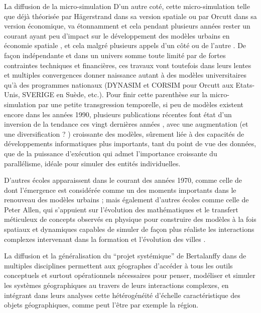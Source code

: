 \begin{testiv}{La diffusion de la micro-simulation}{}
D'un autre coté, cette micro-simulation telle que déjà théorisée par Hägerstrand dans sa version spatiale ou par Orcutt dans sa version économique, va étonnamment et cela pendant plusieurs années rester un courant ayant peu d'impact sur le développement des modèles urbains en économie spatiale \autocite[5]{Sanders2006}, et cela malgré plusieurs appels d'un côté \autocite{Hagerstrand1970} ou de l'autre \autocite[5]{Isard1998}. De façon indépendante et dans un univers somme toute limité par de fortes contraintes techniques et financières, ces travaux vont toutefois dans leurs lentes et multiples convergences donner naissance autant à des modèles universitaires qu'à des programmes nationaux (DYNASIM et CORSIM pour Orcutt aux Etats-Unis, SVERIGE en Suède, etc.). Pour finir cette parenthèse sur la micro-simulation par une petite transgression temporelle, si peu de modèles existent encore dans les années 1990, plusieurs publications récentes font état d'un inversion de la tendance ces vingt dernières années \autocite{Lenormand2013}, avec une augmentation (et une diversification ? ) croissante des modèles, sûrement liée à des capacités de développements informatiques plus importants, tant du point de vue des données, que de la puissance d’exécution qui admet l'importance croissante du parallélisme, idéale pour simuler des entités individuelles. \autocites[5]{Sanders2006}{Lenormand2013}

\end{testiv}

D'autres écoles apparaissent dans le courant des années 1970, comme celle de \textcite{Wilson1970} dont l'émergence est considérée comme un des moments importants dans le renouveau des modèles urbains \autocite{Griffith2010}; mais également d'autres écoles comme celle de Peter Allen, qui s'appuient sur l'évolution des mathématiques et le transfert méticuleux de concepts observés en physique pour construire des modèles à la fois spatiaux et dynamiques capables de simuler de façon plus réaliste les interactions complexes intervenant dans la formation et l'évolution des villes \autocites[11]{Batty1976}{Batty2001}[27-28]{Pumain2003} .

La diffusion et la généralisation du \enquote{projet systémique} de Bertalanffy dans de multiples disciplines permettent aux géographes d'accéder à tous les outils conceptuels et surtout opérationnels \autocite{Forrester1969} nécessaires pour penser, modéliser et simuler les systèmes géographiques au travers de leurs interactions complexes, en intégrant dans leurs analyses cette hétérogénéité d'échelle caractéristique des objets géographiques, comme peut l'être par exemple la région.

